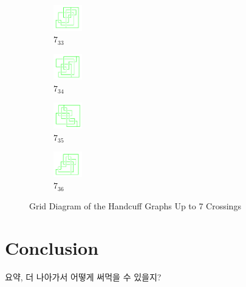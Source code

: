 \documentclass{article}
\theoremstyle{definition}
\theoremstyle{theorem}
\theoremstyle{proposition}
\theoremstyle{corollary}
\begin{document}
\begin{figure}[H]
\begin{subfigure}{0.075\textwidth}
    \includegraphics[width=1.25cm]{../Midterm_Poster/grid_diagram/handcuff_7_33.png}
    \caption{$7_{33}$} 
    \end{subfigure}
    \begin{subfigure}{0.075\textwidth}
    \includegraphics[width=1.25cm]{../Midterm_Poster/grid_diagram/handcuff_7_34.png}
    \caption{$7_{34}$} 
    \end{subfigure}
    \begin{subfigure}{0.075\textwidth}
    \includegraphics[width=1.25cm]{../Midterm_Poster/grid_diagram/handcuff_7_35.png}
    \caption{$7_{35}$} 
    \end{subfigure}
    \begin{subfigure}{0.075\textwidth}
    \includegraphics[width=1.25cm]{../Midterm_Poster/grid_diagram/handcuff_7_36.png}
    \caption{$7_{36}$} 
    \end{subfigure}
    \caption{Grid Diagram of the Handcuff Graphs Up to 7 Crossings}
  \end{figure}


\section{Conclusion}
요약, 더 나아가서 어떻게 써먹을 수 있을지?
\end{document}
